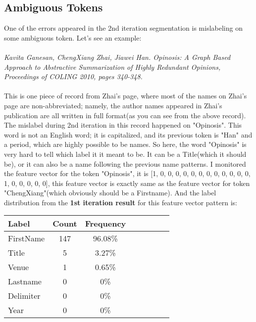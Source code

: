 \documentclass[11pt]{article}
\begin{document}
\subsection{Ambiguous Tokens}
One of the errors appeared in the 2nd iteration segmentation is mislabeling on some ambiguous token. Let's see an example:\\\\
\textit{
	Kavita Ganesan, ChengXiang Zhai, Jiawei Han. Opinosis: A Graph Based Approach to Abstractive Summarization of Highly Redundant Opinions,  Proceedings of COLING 2010, pages 340-348.
}\\\\
This is one piece of record from Zhai's page, where most of the names on Zhai's page are non-abbreviated; namely, the author names appeared in Zhai's publication are all written in full format(as you can see from the above record). The mislabel during 2nd iteration in this record happened on "Opinosis". This word is not an English word; it is capitalized, and its previous token is "Han" and a period, which are highly possible to be names. So here, the word "Opinosis" is very hard to tell which label it it meant to be. It can be a Title(which it should be), or it can also be a name following the previous name patterns. I monitored the feature vector for the token "Opinosis", it is [1, 0, 0, 0, 0, 0, 0, 0, 0, 0, 0, 0, 0, 1, 0, 0, 0, 0, 0], this feature vector is exactly same as the feature vector for token "ChengXiang"(which obviously should be a Firstname). And the label distribution from the \textbf{1st iteration result} for this feature vector pattern is:\\
\begin{center}
\begin{tabular}{l*{6}{c}r}
Label				& Count 		& Frequency\\
\hline
FirstName 			& 147		& 96.08\% \\
Title				& 5			& 3.27\% \\
Venue				& 1			& 0.65\% \\
Lastname				& 0 			& 0\% \\
Delimiter			& 0 			& 0\% \\
Year					& 0 			& 0\%\\
\end{tabular}
\end{center}
\end{document}
